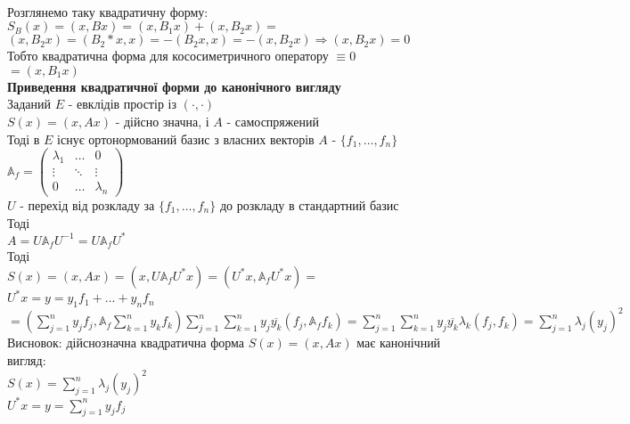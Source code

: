 \documentclass[a4paper, 10pt]{article}
\theoremstyle{theoremdd}
\begin{document}
\bigskip \\
Розглянемо таку квадратичну форму:\\
$S_B(x) = (x,Bx) = (x,B_1x) + (x,B_2x) \boxed{=} $\\
$(x,B_2x) = (B_2*x,x) = -(B_2x,x) = -(x,B_2x) \Rightarrow (x,B_2x) = 0$\\
Тобто квадратична форма для кососиметричного оператору $\equiv 0$\\
$\boxed{=} (x,B_1x)$
\bigskip \\
\textbf{Приведення квадратичної форми до канонічного вигляду}\\
Заданий $E$ - евклідів простір із $(\cdot,\cdot)$\\
$S(x) = (x,Ax)$ - дійсно значна, і $A$ - самоспряжений\\
Тоді в $E$ існує ортонормований базис з власних векторів $A$ - $\{f_1,\dots,f_n\}$\\
$\mathbb{A}_f = \begin{pmatrix}
\lambda_1 & \dots & 0 \\
\vdots & \ddots & \vdots \\
0 & \dots & \lambda_n
\end{pmatrix}$\\
$U$ - перехід від розкладу за $\{f_1,\dots,f_n\}$ до розкладу в стандартний базис\\
Тоді\\
$A = U \mathbb{A}_{f} U^{-1} = U \mathbb{A}_{f} U^{*}$\\
Тоді\\
$S(x) = (x,Ax) = (x,U \mathbb{A}_{f} U^{*} x) = (U^*x, \mathbb{A}_{f} U^{*} x) =$\\
$U^* x = y = y_1f_1 + \dots + y_nf_n$\\
$= \displaystyle \left(\sum_{j=1}^n y_jf_j, \mathbb{A}_{f} \sum_{k=1}^n y_k f_k \right) \sum_{j=1}^n \sum_{k=1}^n y_j \overline{y_k} (f_j, \mathbb{A}_f f_k) = \sum_{j=1}^n \sum_{k=1}^n y_j \overline{y_k} \lambda_k (f_j,f_k) = \sum_{j=1}^n \lambda_j (y_j)^2$\\
Висновок: дійснозначна квадратична форма $S(x) = (x,Ax)$ має канонічний вигляд:\\
$S(x) = \displaystyle \sum_{j=1}^n \lambda_j (y_j)^2$\\
$U^*x = y = \displaystyle \sum_{j=1}^n y_j f_j$\\
\end{document}
